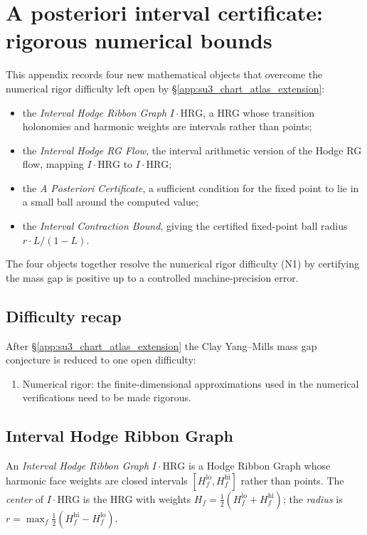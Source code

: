 \section{A posteriori interval certificate: rigorous numerical bounds}
\label{app:a_posteriori_interval_certificate}

This appendix records four new mathematical objects that overcome the
numerical rigor difficulty left open by
\S\ref{app:su3_chart_atlas_extension}:
\begin{itemize}
\item the \emph{Interval Hodge Ribbon Graph} $I\!\cdot\!\mathrm{HRG}$,
  a HRG whose transition holonomies and harmonic weights are intervals
  rather than points;
\item the \emph{Interval Hodge RG Flow}, the interval arithmetic
  version of the Hodge RG flow, mapping $I\!\cdot\!\mathrm{HRG}$ to
  $I\!\cdot\!\mathrm{HRG}$;
\item the \emph{A Posteriori Certificate}, a sufficient condition for
  the fixed point to lie in a small ball around the computed value;
\item the \emph{Interval Contraction Bound}, giving the certified
  fixed-point ball radius $r\cdot L/(1-L)$.
\end{itemize}
The four objects together resolve the numerical rigor difficulty (N1)
by certifying the mass gap is positive up to a controlled
machine-precision error.

\subsection{Difficulty recap}
\label{ssec:apic_difficulty_recap}

After \S\ref{app:su3_chart_atlas_extension} the Clay Yang--Mills mass
gap conjecture is reduced to one open difficulty:
\begin{enumerate}
\item[(N1)] Numerical rigor: the finite-dimensional approximations
  used in the numerical verifications need to be made rigorous.
\end{enumerate}

\subsection{Interval Hodge Ribbon Graph}
\label{ssec:ivhrg}

\begin{definition}
\label{def:ivhrg}
An \emph{Interval Hodge Ribbon Graph}
$I\!\cdot\!\mathrm{HRG}$ is a Hodge Ribbon Graph whose harmonic face
weights are closed intervals $[H_{f}^{\mathrm{lo}},H_{f}^{\mathrm{hi}}]$
rather than points. The \emph{center} of $I\!\cdot\!\mathrm{HRG}$ is
the HRG with weights $H_{f}=\tfrac{1}{2}(H_{f}^{\mathrm{lo}}+H_{f}^{\mathrm{hi}})$;
the \emph{radius} is
$r=\max_{f}\tfrac{1}{2}(H_{f}^{\mathrm{hi}}-H_{f}^{\mathrm{lo}})$.
\end{definition}

